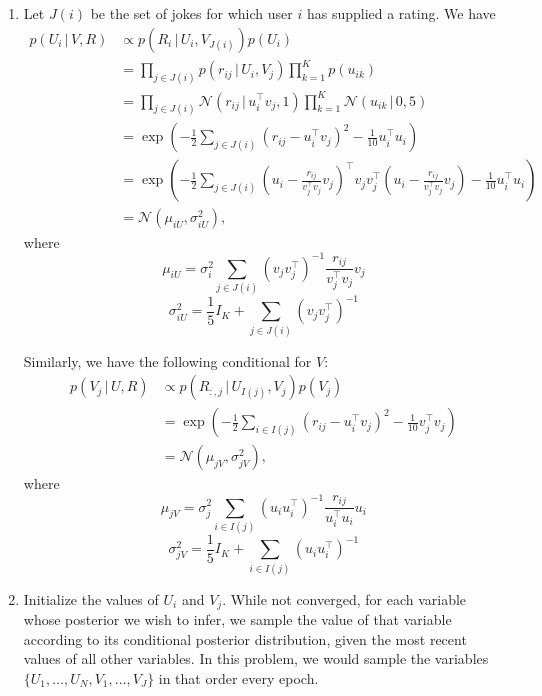 \documentclass[submit]{harvardml}
\newcommand{\given}{\,|\,}
\newcommand{\N}{\mathcal{N}}
\theoremstyle{plain}
\begin{document}
\begin{enumerate}
	\item Let $J(i)$ be the set of jokes for which user $i$ has supplied a rating. We have
	\begin{align*}
	p(U_i\given V, R) &\propto p(R_i\given U_i, V_{J(i)}) p(U_i) \\
	&= \prod_{j\in J(i)} p(r_{ij}\given U_i, V_j) \prod_{k=1}^K p(u_{ik}) \\
	&= \prod_{j\in J(i)} \mathcal{N}(r_{ij}\given u_i^\top v_j, 1) \prod_{k=1}^K \mathcal{N}(u_{ik} \given 0, 5) \\
	&= \exp\left(-\frac{1}{2} \sum_{j\in J(i)} (r_{ij} - u_i^\top v_j)^2 - \frac{1}{10} u_{i}^\top u_i\right) \\
	&= \exp\left(-\frac{1}{2} \sum_{j\in J(i)} (u_i - \frac{r_{ij}}{v_j^\top v_j}v_j )^\top v_j v_j^\top (u_i - \frac{r_{ij}}{v_j^\top v_j}v_j ) - \frac{1}{10} u_{i}^\top u_i\right) \\
	&= \N(\mu_{iU}, \sigma_{iU}^2),
	\end{align*}
	where 
	\[\mu_{iU} = \sigma_i^2 \sum_{j\in J(i)} (v_j v_j^\top)^{-1} \frac{r_{ij}}{v_j^\top v_j} v_j\]
	\[\sigma_{iU}^2 = \frac{1}{5} I_K + \sum_{j\in J(i)}(v_j v_j^\top)^{-1}\]
	
	Similarly, we have the following conditional for $V$:
	\begin{align*}
	p(V_j\given U, R) &\propto p(R_{:, j}\given U_{I(j)}, V_j) p(V_j) \\
	&= \exp\left(-\frac{1}{2} \sum_{i\in I(j)} (r_{ij} - u_i^\top v_j)^2 - \frac{1}{10} v_{j}^\top v_j\right) \\
	&= \N(\mu_{jV}, \sigma_{jV}^2),
	\end{align*}
	where 
	\[\mu_{jV} = \sigma_j^2 \sum_{i\in I(j)} (u_i u_i^\top)^{-1} \frac{r_{ij}}{u_i^\top u_i} u_i\]
	\[\sigma_{jV}^2 = \frac{1}{5} I_K + \sum_{i\in I(j)}(u_i u_i^\top)^{-1}\]
	
	
	\item Initialize the values of $U_i$ and $V_j$. While not converged, for each variable whose posterior we wish to infer, we sample the value of that variable according to its conditional posterior distribution, given the most recent values of all other variables. In this problem, we would sample the variables $\{U_1,\dots,U_N,V_1,\dots,V_J\}$ in that order every epoch.
	
\end{enumerate}
\end{document}
